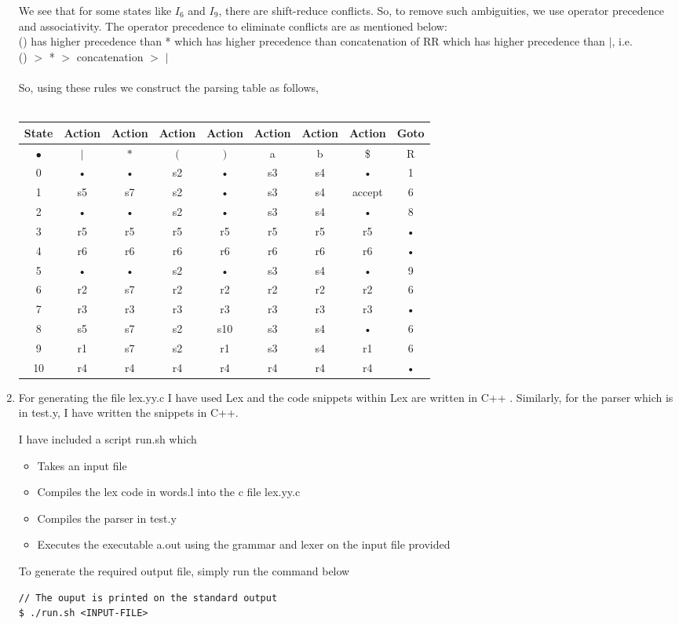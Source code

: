\documentclass[10pt]{letter}
\begin{document}
\begin{enumerate}
We see that for some states like $I_{6}$ and $I_{9}$, there are shift-reduce conflicts. So, to remove such ambiguities, we use operator precedence and associativity. The operator precedence to eliminate conflicts are as mentioned below: \\
() has higher precedence than * which has higher precedence than concatenation of RR which has higher precedence than $|$, i.e.  \\
() $>$ * $>$ concatenation $>$ $|$ \\
\\
So, using these rules we construct the parsing table as follows, \\
\\
\begin{tabular}{|c|c|c|c|c|c|c|c|c|}
\hline 
State & Action & Action & Action & Action & Action & Action & Action & Goto \\ 
\hline 
$•$ & $|$ & $*$ & $($ & $)$ & a & b & \$ & R \\ 
\hline 
0 & • & • & s2 & • & s3 & s4 & • & 1 \\ 
\hline 
1 & s5 & s7 & s2 & • & s3 & s4 & accept & 6 \\ 
\hline 
2 & • & • & s2 & • & s3 & s4 & • & 8 \\ 
\hline 
3 & r5 & r5 & r5 & r5 & r5 & r5 & r5 & • \\ 
\hline 
4 & r6 & r6 & r6 & r6 & r6 & r6 & r6 & • \\ 
\hline 
5 & • & • & s2 & • & s3 & s4 & • & 9 \\ 
\hline 
6 & r2 & s7 & r2 & r2 & r2 & r2 & r2 & 6 \\ 
\hline 
7 & r3 & r3 & r3 & r3 & r3 & r3 & r3 & • \\ 
\hline 
8 & s5 & s7 & s2 & s10 & s3 & s4 & • & 6 \\ 
\hline 
9 & r1 & s7 & s2 & r1 & s3 & s4 & r1 & 6 \\ 
\hline 
10 & r4 & r4 & r4 & r4 & r4 & r4 & r4 & • \\ 
\hline 
\end{tabular}
\item 

For generating the file lex.yy.c I have used Lex and the code snippets within Lex are written in C++
. Similarly, for the parser which is in test.y, I have written the snippets in C++.
 
I have included a script run.sh which 
\begin{itemize}
    \item Takes an input file
    \item Compiles the lex code in words.l into the c file lex.yy.c
    \item Compiles the parser in test.y 
    \item Executes the executable a.out using the grammar and lexer on the input file provided
\end{itemize}

To generate the required output file, simply run the command below  
\begin{lstlisting}
// The ouput is printed on the standard output
$ ./run.sh <INPUT-FILE>
\end{lstlisting} 
\end{enumerate}
\end{document}
